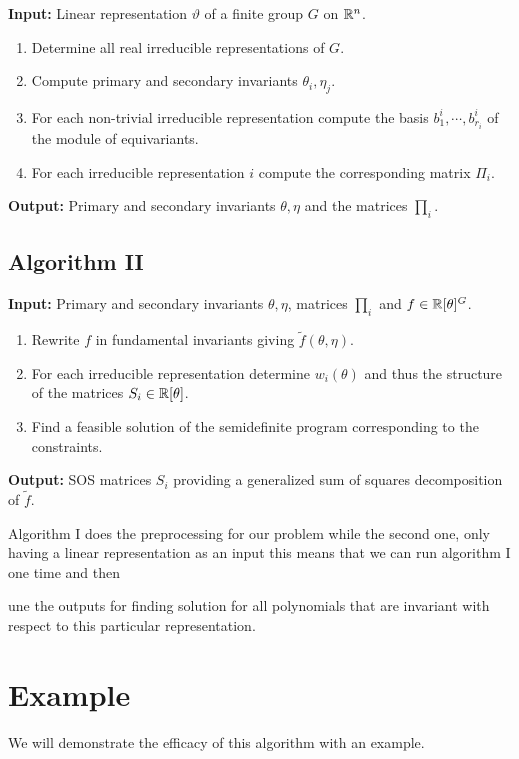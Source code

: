 \documentclass[]{article}
\begin{document}
\textbf{Input:} Linear representation $\vartheta$ of a finite group $G$ on $\mathbb R^n$.

\begin{enumerate}
    \item Determine all real irreducible representations of $G$.
    \item Compute primary and secondary invariants $\theta_i,\eta_j$. 
    \item For each non-trivial irreducible representation compute the basis $b_1^i,\cdots, b_{r_i}^i$ of the module of equivariants.
    \item For each irreducible representation $i$ compute the corresponding matrix $\Pi_i$.
\end{enumerate}
\noindent
\textbf{Output:} Primary and secondary invariants $\theta,\eta$ and the matrices $\prod_i$.

\subsection*{Algorithm II}

\textbf{Input: } Primary and secondary invariants $\theta,\eta$, matrices $\prod_i$ and $f \in \mathbb R[\theta]^G$.

\begin{enumerate}
    \item Rewrite $f$ in fundamental invariants giving $\tilde{f}(\theta,\eta)$.
    \item For each irreducible representation determine $w_i(\theta)$ and thus the structure of the matrices $S_i\in \mathbb R[\theta]$.
    \item Find a feasible solution of the semidefinite program corresponding to the constraints.
\end{enumerate}
\noindent
\textbf{Output:} SOS matrices $S_i$ providing a generalized sum of squares decomposition of $\tilde{f}$.



Algorithm I does the preprocessing for our problem while the second one, only having a linear representation as an input
this means that we can run algorithm I one time and then 


une the outputs for finding solution for 
all polynomials that are invariant with respect to this particular representation.


\section{Example}
We will demonstrate the efficacy of this algorithm with an example.
\end{document}
